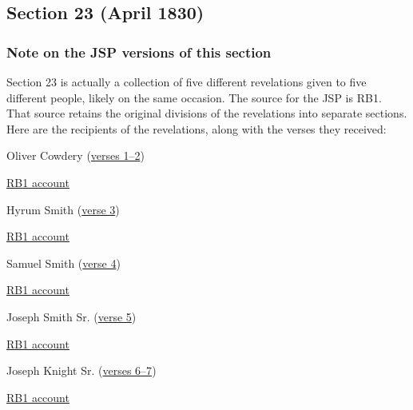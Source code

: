 \subsection{Section 23 (April 1830)}
	\label{DC23}
	
	\subsubsection{Note on the JSP versions of this section}
		\label{DC23-JSP}
	
		Section 23 is actually a collection of five different revelations given to five different people, likely on the same occasion. The source for the JSP is RB1. That source retains the original divisions of the revelations into separate sections. Here are the recipients of the revelations, along with the verses they received:
		
			\begin{compactitem}
				\item Oliver Cowdery (\hyperref[DC23-1]{verses 1--2})
					\begin{compactitem}
						\item \hyperref[EMS-1830-JS-APR-1830-A]{RB1 account}
					\end{compactitem}
				\item Hyrum Smith (\hyperref[DC23-3]{verse 3})
					\begin{compactitem}
						\item \hyperref[EMS-1830-JS-APR-1830-B]{RB1 account}
					\end{compactitem}
				\item Samuel Smith (\hyperref[DC23-4]{verse 4})
					\begin{compactitem}
						\item \hyperref[EMS-1830-JS-APR-1830-C]{RB1 account}
					\end{compactitem}
				\item Joseph Smith Sr. (\hyperref[DC23-5]{verse 5})
					\begin{compactitem}
						\item \hyperref[EMS-1830-JS-APR-1830-D]{RB1 account}
					\end{compactitem}
				\item Joseph Knight Sr. (\hyperref[DC23-6]{verses 6--7})
					\begin{compactitem}
						\item \hyperref[EMS-1830-JS-APR-1830-E]{RB1 account}
					\end{compactitem}
			\end{compactitem}
	
